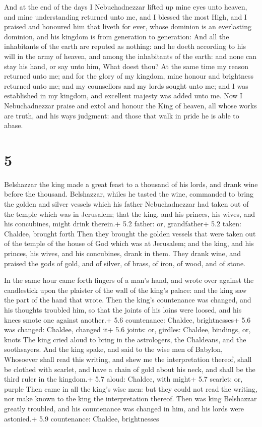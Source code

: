  And at the end of the days I Nebuchadnezzar lifted up mine
eyes unto heaven, and mine understanding returned unto me, and I blessed
the most High, and I praised and honoured him that liveth for ever,
whose dominion is an everlasting dominion, and his kingdom is from
generation to generation:  And all the inhabitants of the
earth are reputed as nothing: and he doeth according to his will in the
army of heaven, and among the inhabitants of the earth: and none can
stay his hand, or say unto him, What doest thou?  At the
same time my reason returned unto me; and for the glory of my kingdom,
mine honour and brightness returned unto me; and my counsellors and my
lords sought unto me; and I was established in my kingdom, and excellent
majesty was added unto me.  Now I Nebuchadnezzar praise and
extol and honour the King of heaven, all whose works are truth, and his
ways judgment: and those that walk in pride he is able to abase.

\hypertarget{section-4}{%
\section{5}\label{section-4}}

 Belshazzar the king made a great feast to a thousand of his
lords, and drank wine before the thousand.  Belshazzar,
whiles he tasted the wine, commanded to bring the golden and silver
vessels which his father Nebuchadnezzar had taken out of the temple
which was in Jerusalem; that the king, and his princes, his wives, and
his concubines, might drink therein.+ 5.2 father: or, grandfather+ 5.2
taken: Chaldee, brought forth  Then they brought the golden
vessels that were taken out of the temple of the house of God which was
at Jerusalem; and the king, and his princes, his wives, and his
concubines, drank in them.  They drank wine, and praised the
gods of gold, and of silver, of brass, of iron, of wood, and of stone.

 In the same hour came forth fingers of a man's hand, and
wrote over against the candlestick upon the plaister of the wall of the
king's palace: and the king saw the part of the hand that wrote.
 Then the king's countenance was changed, and his thoughts
troubled him, so that the joints of his loins were loosed, and his knees
smote one against another.+ 5.6 countenance: Chaldee, brightnesses+ 5.6
was changed: Chaldee, changed it+ 5.6 joints: or, girdles: Chaldee,
bindings, or, knots  The king cried aloud to bring in the
astrologers, the Chaldeans, and the soothsayers. And the king spake, and
said to the wise men of Babylon, Whosoever shall read this writing, and
shew me the interpretation thereof, shall be clothed with scarlet, and
have a chain of gold about his neck, and shall be the third ruler in the
kingdom.+ 5.7 aloud: Chaldee, with might+ 5.7 scarlet: or, purple
 Then came in all the king's wise men: but they could not
read the writing, nor make known to the king the interpretation thereof.
 Then was king Belshazzar greatly troubled, and his
countenance was changed in him, and his lords were astonied.+ 5.9
countenance: Chaldee, brightnesses

